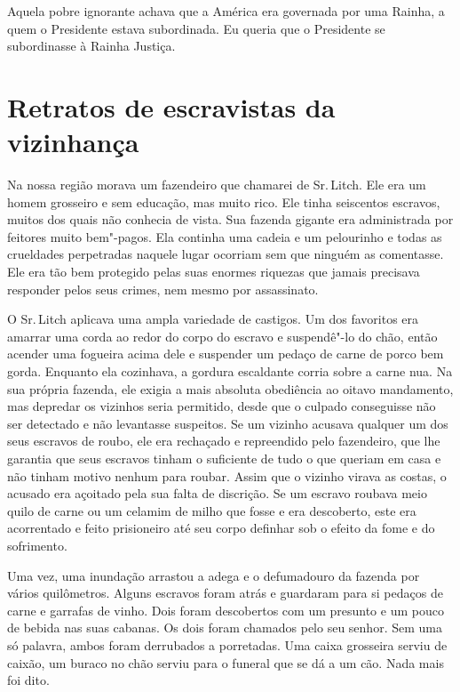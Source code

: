 Aquela pobre ignorante achava que a
América era governada por uma Rainha, a quem o Presidente estava
subordinada. Eu queria que o Presidente se subordinasse à Rainha
Justiça.

\chapter*{Retratos de escravistas da vizinhança}

Na nossa região morava um fazendeiro
que chamarei de Sr.\,Litch. Ele era um homem grosseiro e sem educação,
mas muito rico. Ele tinha seiscentos escravos, muitos dos quais não
conhecia de vista. Sua fazenda gigante era administrada por feitores
muito bem"-pagos. Ela continha uma cadeia e um pelourinho e todas as
crueldades perpetradas naquele lugar ocorriam sem que ninguém as
comentasse. Ele era tão bem protegido pelas suas enormes riquezas que
jamais precisava responder pelos seus crimes, nem mesmo por assassinato.

O Sr.\,Litch aplicava uma ampla
variedade de castigos. Um dos favoritos era amarrar uma corda ao redor
do corpo do escravo e suspendê"-lo do chão, então acender uma fogueira
acima dele e suspender um pedaço de carne de porco bem gorda. Enquanto
ela cozinhava, a gordura escaldante corria sobre a carne nua. Na sua
própria fazenda, ele exigia a mais absoluta obediência ao oitavo
mandamento, mas depredar os vizinhos seria permitido, desde que o
culpado conseguisse não ser detectado e não levantasse suspeitos. Se um
vizinho acusava qualquer um dos seus escravos de roubo, ele era
rechaçado e repreendido pelo fazendeiro, que lhe garantia que seus
escravos tinham o suficiente de tudo o que queriam em casa e não tinham
motivo nenhum para roubar. Assim que o vizinho virava as costas, o
acusado era açoitado pela sua falta de discrição. Se um escravo roubava
meio quilo de carne ou um celamim de milho que fosse e era descoberto,
este era acorrentado e feito prisioneiro até seu corpo definhar sob o
efeito da fome e do sofrimento.

Uma vez, uma inundação arrastou a adega
e o defumadouro da fazenda por vários quilômetros. Alguns escravos foram
atrás e guardaram para si pedaços de carne e garrafas de vinho. Dois
foram descobertos com um presunto e um pouco de bebida nas suas cabanas.
Os dois foram chamados pelo seu senhor. Sem uma só palavra, ambos foram
derrubados a porretadas. Uma caixa grosseira serviu de caixão, um buraco
no chão serviu para o funeral que se dá a um cão. Nada mais foi dito.

